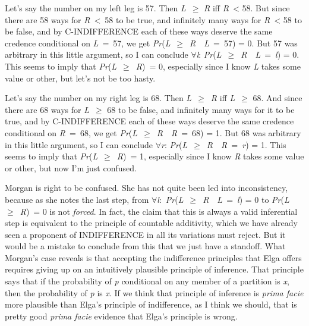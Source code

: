 Let's say the number on my left leg is 57. Then \textit{L}~${\geq}$ \textit{R} iff \textit{R}~{\textless} 58. But since there are 58 ways for \textit{R}~{\textless}~58 to be true, and infinitely many ways for \textit{R}~{\textless} 58 to be false, and by C\nobreakdash-INDIFFERENCE each of these ways deserve the same credence conditional on \textit{L}~=~57, we get \textit{Pr}(\textit{L}~${\geq}$~\textit{R}~{\textbar}~\textit{L}~=~57) = 0. But 57 was arbitrary in this little argument, so I can conclude ${\forall}$\textit{l}: \textit{Pr}(\textit{L}~${\geq}$~\textit{R}~{\textbar}~\textit{L}~=~\textit{l}) = 0. This seems to imply that \textit{Pr}(\textit{L}~${\geq}$~\textit{R})~= 0, especially since I know \textit{L} takes some value or other, but let's not be too hasty.

Let's say the number on my right leg is 68. Then \textit{L}~${\geq}$~\textit{R} iff \textit{L}~${\geq}$ 68. And since there are 68 ways for \textit{L}~${\geq}$ 68 to be false, and infinitely many ways for it to be true, and by C\nobreakdash-INDIFFERENCE each of these ways deserve the same credence conditional on \textit{R}~=~68, we get \textit{Pr}(\textit{L}~${\geq}$~\textit{R}~{\textbar}~\textit{R}~=~68) = 1. But 68 was arbitrary in this little argument, so I can conclude ${\forall}$\textit{r}: \textit{Pr}(\textit{L}~${\geq}$~\textit{R}~{\textbar}~\textit{R}~=~\textit{r}) = 1. This seems to imply that \textit{Pr}(\textit{L}~${\geq}$~\textit{R})~= 1, especially since I know \textit{R} takes some value or other, but now I'm just confused.

Morgan is right to be confused. She has not quite been led into inconsistency, because as she notes the last step, from ${\forall}$\textit{l}:~\textit{Pr}(\textit{L}~${\geq}$~\textit{R}~{\textbar}~\textit{L}~=~\textit{l}) = 0 to \textit{Pr}(\textit{L}~${\geq}$~\textit{R})~= 0 is not \textit{forced}. In fact, the claim that this is always a valid inferential step is equivalent to the principle of countable additivity, which we have already seen a proponent of INDIFFERENCE in all its variations must reject. But it would be a mistake to conclude from this that we just have a standoff. What Morgan's case reveals is that accepting the indifference principles that Elga offers requires giving up on an intuitively plausible principle of inference. That principle says that if the probability of \textit{p} conditional on any member of a partition is \textit{x}, then the probability of \textit{p} is \textit{x}. If we think that principle of inference is \textit{prima facie} more plausible than Elga's principle of indifference, as I think we should, that is pretty good \textit{prima facie} evidence that Elga's principle is wrong.

